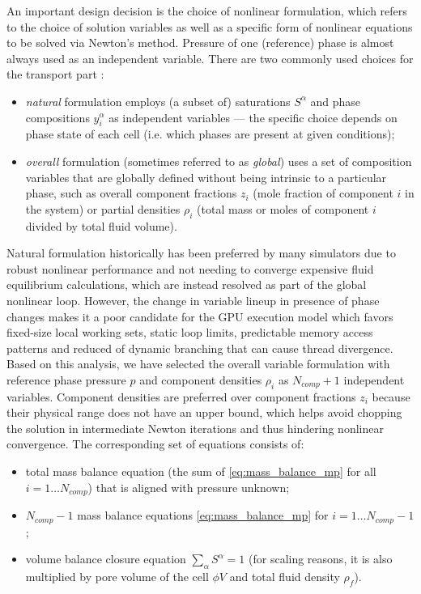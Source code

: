 An important design decision is the choice of nonlinear formulation, which refers to the choice of solution variables as well as a specific form of nonlinear equations to be solved via Newton's method.   Pressure of one (reference) phase is almost always used as an independent variable.   There are two commonly used choices for the transport part \cite{Cao2002}:
\begin{itemize}
    \item \textit{natural} formulation employs (a subset of) saturations $S^\alpha$ and phase compositions $y_i^\alpha$ as independent variables --- the specific choice depends on phase state of each cell (i.e. which phases are present at given conditions);
    \item \textit{overall} formulation (sometimes referred to as \textit{global}) uses a set of composition variables that are globally defined without being intrinsic to a particular phase, such as overall component fractions $z_i$ (mole fraction of component $i$ in the system) or partial densities $\rho_i$ (total mass or moles of component $i$ divided by total fluid volume).
\end{itemize}
Natural formulation historically has been preferred by many simulators due to robust nonlinear performance and not needing to converge expensive fluid equilibrium calculations, which are instead resolved as part of the global nonlinear loop.   However, the change in variable lineup in presence of phase changes makes it a poor candidate for the GPU execution model which favors fixed-size local working sets, static loop limits, predictable memory access patterns and reduced of dynamic branching that can cause thread divergence.   Based on this analysis, we have selected the overall variable formulation with reference phase pressure $p$ and component densities $\rho_i$ as $N_{comp} + 1$ independent variables.   Component densities are preferred over component fractions $z_i$ because their physical range does not have an upper bound, which helps avoid chopping the solution in intermediate Newton iterations and thus hindering nonlinear convergence.    The corresponding set of equations consists of:
\begin{itemize}
    \item total mass balance equation (the sum of \cref{eq:mass_balance_mp} for all $i = 1 \ldots N_{comp}$) that is aligned with pressure unknown;
    \item $N_{comp} - 1$ mass balance equations \cref{eq:mass_balance_mp} for $i = 1 \ldots N_{comp}-1$;
    \item volume balance closure equation $\sum\limits_\alpha S^\alpha = 1$ (for scaling reasons, it is also multiplied by pore volume of the cell $\phi V$ and total fluid density $\rho_f$).
\end{itemize}

